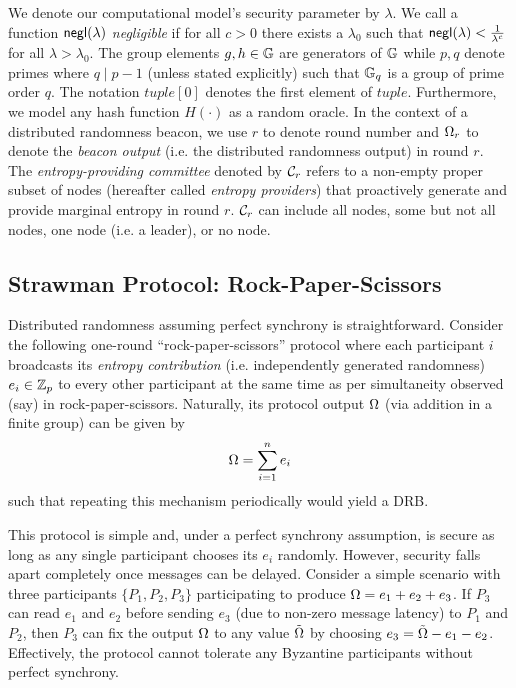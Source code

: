 We denote our computational model's security parameter by $\lambda$. We call a function $\mathsf{negl}(\lambda)$ \textit{negligible} if for all $c > 0$ there exists a $\lambda_0$ such that $\mathsf{negl}(\lambda) < \frac{1}{\lambda^c}$ for all $\lambda > \lambda_0$. The group elements $g, h \in \mathbb{G}$ are generators of $\mathbb{G}$ while $p, q$ denote primes where $q \mid p - 1$ (unless stated explicitly) such that $\mathbb{G}_q$ is a group of prime order $q$. The notation $tuple[0]$ denotes the first element of $tuple$. Furthermore, we model any hash function $H(\cdot)$ as a random oracle. In the context of a distributed randomness beacon, we use $r$ to denote round number and $\Omega_r$ to denote the \textit{beacon output} (i.e. the distributed randomness output) in round $r$. The \textit{entropy-providing committee} denoted by $\mathcal{C}_r$ refers to a non-empty proper subset of nodes (hereafter called \textit{entropy providers}) that proactively generate and provide marginal entropy in round $r$. $\mathcal{C}_r$ can include all nodes, some but not all nodes, one node (i.e. a leader), or no node.

\subsection{Strawman Protocol: Rock-Paper-Scissors}
Distributed randomness assuming perfect synchrony is straightforward. Consider the following one-round ``rock-paper-scissors'' protocol where each participant $i$ broadcasts its \textit{entropy contribution} (i.e. independently generated randomness) $e_i \in \mathbb{Z}_p$ to every other participant at the same time as per simultaneity observed (say) in rock-paper-scissors. Naturally, its protocol output $\Omega$ (via addition in a finite group) can be given by
\begin{equation}
\label{equation:addall}
\drboutput = \sum_{i = 1}^n e_i
\end{equation}
such that repeating this mechanism periodically would yield a DRB.

This protocol is simple and, under a perfect synchrony assumption, is secure as long as any single participant chooses its $e_i$ randomly. However, security falls apart completely once messages can be delayed.
Consider a simple scenario with three participants $\{P_1, P_2, P_3\}$ participating to produce $\Omega = e_1 + e_2 + e_3$. If $P_3$ can read $e_1$ and $e_2$ before sending $e_3$ (due to non-zero message latency) to $P_1$ and $P_2$, then $P_3$ can fix the output $\Omega$ to any value $\tilde{\Omega}$ by choosing $e_3 = \tilde{\Omega} - e_1 - e_2$. Effectively, the protocol cannot tolerate any Byzantine participants without perfect synchrony.

